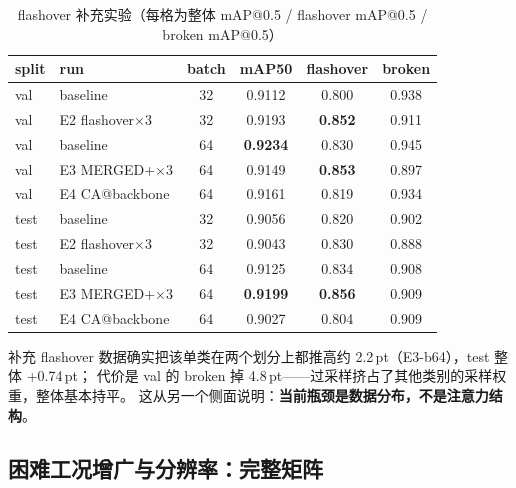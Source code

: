 \documentclass[UTF8,a4paper,11pt]{ctexart}
\begin{document}
\begin{table}[htbp]
\centering
\caption{flashover 补充实验（每格为整体 mAP@0.5 / flashover mAP@0.5 / broken mAP@0.5）}
\label{tab:flash}
\begin{tabular}{llcccc}
\toprule
split & run & batch & mAP50 & flashover & broken \\
\midrule
val  & baseline            & 32 & 0.9112 & 0.800 & 0.938 \\
val  & E2 flashover$\times$3 & 32 & 0.9193 & \textbf{0.852} & 0.911 \\
val  & baseline            & 64 & \textbf{0.9234} & 0.830 & 0.945 \\
val  & E3 MERGED+$\times$3   & 64 & 0.9149 & \textbf{0.853} & 0.897 \\
val  & E4 CA@backbone      & 64 & 0.9161 & 0.819 & 0.934 \\
\midrule
test & baseline            & 32 & 0.9056 & 0.820 & 0.902 \\
test & E2 flashover$\times$3 & 32 & 0.9043 & 0.830 & 0.888 \\
test & baseline            & 64 & 0.9125 & 0.834 & 0.908 \\
test & E3 MERGED+$\times$3   & 64 & \textbf{0.9199} & \textbf{0.856} & 0.909 \\
test & E4 CA@backbone      & 64 & 0.9027 & 0.804 & 0.909 \\
\bottomrule
\end{tabular}
\end{table}

补充 flashover 数据确实把该单类在两个划分上都推高约 2.2\,pt（E3-b64），test 整体 +0.74\,pt；
代价是 val 的 broken 掉 4.8\,pt——过采样挤占了其他类别的采样权重，整体基本持平。
这从另一个侧面说明：\textbf{当前瓶颈是数据分布，不是注意力结构}。

\subsection{困难工况增广与分辨率：完整矩阵}
\end{document}
